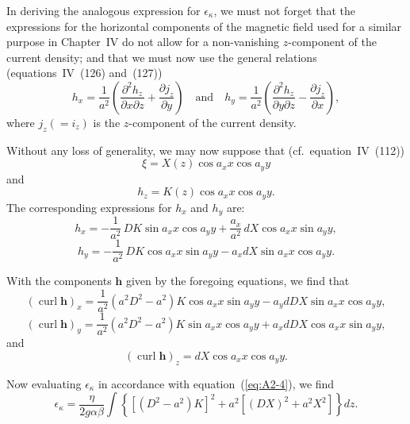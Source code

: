 In deriving the analogous expression for $\epsilon_\kappa$, we must not forget that the expressions for the horizontal components of the magnetic field used for a similar purpose in Chapter~IV do not allow for a non-vanishing $z$-component of the current density; and that we must now use the general relations (equations~IV~(126) and~(127))
\begin{equation}
\label{eq:A2-6}
h_x = \frac{1}{a^2}\left( \frac{\partial^2 h_z}{\partial x \partial z} + \frac{\partial j_z}{\partial y} \right) \quad \text{and} \quad h_y = \frac{1}{a^2}\left( \frac{\partial^2 h_z}{\partial y \partial z} - \frac{\partial j_z}{\partial x} \right),
\end{equation}
where $j_z(= i_z)$ is the $z$-component of the current density.

Without any loss of generality, we may now suppose that (cf.\ equation~IV~(112))
\begin{equation}
\label{eq:A2-7}
\xi = X(z) \cos a_x x \cos a_y y
\end{equation}
and
\begin{equation}
\label{eq:A2-8}
h_z = K(z) \cos a_x x \cos a_y y.
\end{equation}
The corresponding expressions for $h_x$ and $h_y$ are:
\begin{equation}
\label{eq:A2-9}
h_x = -\frac{1}{a^2}\, DK \sin a_x x \cos a_y y + \frac{a_x}{a^2}\, dX \cos a_x x \sin a_y y,
\end{equation}
\begin{equation}
\label{eq:A2-10}
h_y = -\frac{1}{a^2}\, DK \cos a_x x \sin a_y y - a_x dX \sin a_x x \cos a_y y.
\end{equation}

With the components $\mathbf{h}$ given by the foregoing equations, we find that
\begin{equation}
\label{eq:A2-11}
(\operatorname{curl} \mathbf{h})_x = \frac{1}{a^2}(a^2 D^2 - a^2) K \cos a_x x \sin a_y y - a_y dDX \sin a_x x \cos a_y y,
\end{equation}
\begin{equation}
\label{eq:A2-12}
(\operatorname{curl} \mathbf{h})_y = \frac{1}{a^2}(a^2 D^2 - a^2) K \sin a_x x \cos a_y y + a_x dDX \cos a_x x \sin a_y y,
\end{equation}
and
\begin{equation}
\label{eq:A2-13}
(\operatorname{curl} \mathbf{h})_z = dX \cos a_x x \cos a_y y.
\end{equation}

Now evaluating $\epsilon_\kappa$ in accordance with equation~(\ref{eq:A2-4}), we find
\begin{equation}
\label{eq:A2-14}
\epsilon_\kappa = \frac{\eta}{2g\alpha\beta} \int \left\{ [(D^2 - a^2)K]^2 + a^2[(DX)^2 + a^2 X^2] \right\} dz.
\end{equation}

